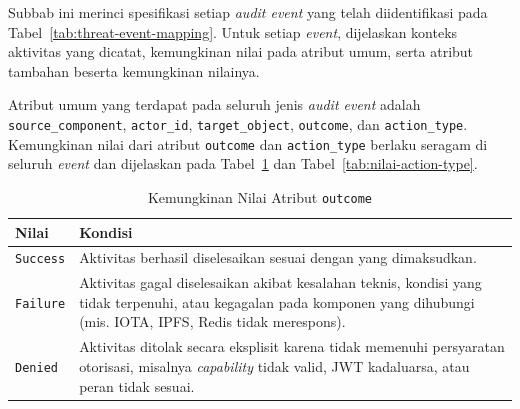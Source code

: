 

Subbab ini merinci spesifikasi setiap \textit{audit event} yang telah
diidentifikasi pada Tabel~\ref{tab:threat-event-mapping}. Untuk setiap
\textit{event}, dijelaskan konteks aktivitas yang dicatat, kemungkinan nilai
pada atribut umum, serta atribut tambahan beserta kemungkinan nilainya.

Atribut umum yang terdapat pada seluruh jenis \textit{audit event} adalah
\texttt{source\_component}, \texttt{actor\_id}, \texttt{target\_object},
\texttt{outcome}, dan \texttt{action\_type}. Kemungkinan nilai dari atribut
\texttt{outcome} dan \texttt{action\_type} berlaku seragam di seluruh
\textit{event} dan dijelaskan pada Tabel~\ref{tab:nilai-outcome} dan
Tabel~\ref{tab:nilai-action-type}.

\begin{table}[htbp]
\centering
\caption{Kemungkinan Nilai Atribut \texttt{outcome}}
\label{tab:nilai-outcome}
\renewcommand{\arraystretch}{1.3}
\begin{tabular}{|p{2.5cm}|p{9.5cm}|}
\hline
\textbf{Nilai} & \textbf{Kondisi} \\
\hline
\texttt{Success} &
Aktivitas berhasil diselesaikan sesuai dengan yang dimaksudkan. \\
\hline
\texttt{Failure} &
Aktivitas gagal diselesaikan akibat kesalahan teknis, kondisi yang tidak
terpenuhi, atau kegagalan pada komponen yang dihubungi (mis. IOTA, IPFS,
Redis tidak merespons). \\
\hline
\texttt{Denied} &
Aktivitas ditolak secara eksplisit karena tidak memenuhi persyaratan
otorisasi, misalnya \textit{capability} tidak valid, JWT kadaluarsa, atau
peran tidak sesuai. \\
\hline
\end{tabular}
\end{table}

